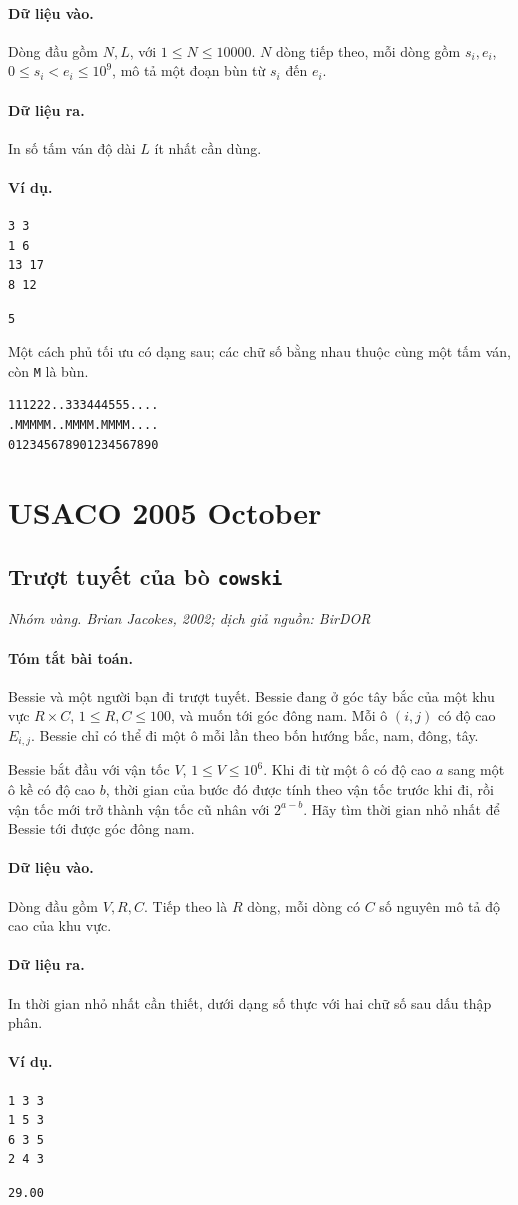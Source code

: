 \documentclass[11pt]{article}
\newcommand{\problem}[4]{%
  \subsection[#1 (#2)]{#1 \hfill {\normalsize\texttt{#2}}}%
  \noindent\textit{#3. #4}\par\smallskip
}
\newcommand{\iosec}[1]{\paragraph{#1}}
\begin{document}
\iosec{Dữ liệu vào.}
Dòng đầu gồm \(N,L\), với \(1\le N\le 10000\). \(N\) dòng tiếp theo, mỗi dòng
gồm \(s_i,e_i\), \(0\le s_i<e_i\le 10^9\), mô tả một đoạn bùn từ \(s_i\) đến
\(e_i\).

\iosec{Dữ liệu ra.}
In số tấm ván độ dài \(L\) ít nhất cần dùng.

\iosec{Ví dụ.}
\begin{verbatim}
3 3
1 6
13 17
8 12
\end{verbatim}

\begin{verbatim}
5
\end{verbatim}

Một cách phủ tối ưu có dạng sau; các chữ số bằng nhau thuộc cùng một tấm ván,
còn \texttt{M} là bùn.
\begin{verbatim}
111222..333444555....
.MMMMM..MMMM.MMMM....
012345678901234567890
\end{verbatim}

\section{USACO 2005 October}

\problem{Trượt tuyết của bò}{cowski}{Nhóm vàng}{Brian Jacokes, 2002; dịch giả nguồn: BirDOR}

\iosec{Tóm tắt bài toán.}
Bessie và một người bạn đi trượt tuyết. Bessie đang ở góc tây bắc của một khu
vực \(R\times C\), \(1\le R,C\le 100\), và muốn tới góc đông nam. Mỗi ô
\((i,j)\) có độ cao \(E_{i,j}\). Bessie chỉ có thể đi một ô mỗi lần theo bốn
hướng bắc, nam, đông, tây.

Bessie bắt đầu với vận tốc \(V\), \(1\le V\le 10^6\). Khi đi từ một ô có độ
cao \(a\) sang một ô kề có độ cao \(b\), thời gian của bước đó được tính theo
vận tốc trước khi đi, rồi vận tốc mới trở thành vận tốc cũ nhân với
\(2^{a-b}\). Hãy tìm thời gian nhỏ nhất để Bessie tới được góc đông nam.

\iosec{Dữ liệu vào.}
Dòng đầu gồm \(V,R,C\). Tiếp theo là \(R\) dòng, mỗi dòng có \(C\) số nguyên
mô tả độ cao của khu vực.

\iosec{Dữ liệu ra.}
In thời gian nhỏ nhất cần thiết, dưới dạng số thực với hai chữ số sau dấu
thập phân.

\iosec{Ví dụ.}
\begin{verbatim}
1 3 3
1 5 3
6 3 5
2 4 3
\end{verbatim}

\begin{verbatim}
29.00
\end{verbatim}
\end{document}
